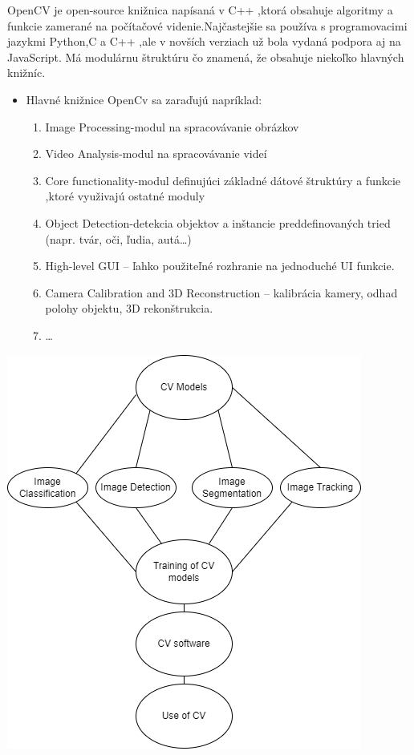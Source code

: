 \documentclass[10pt,twoside,slovak,a4paper]{article}
\begin{document}

OpenCV je  open-source knižnica napísaná v C++ ,ktorá obsahuje algoritmy a funkcie zamerané na počítačové videnie.Najčastejšie sa používa s programovacimi jazykmi Python,C a C++ ,ale v novších verziach už bola vydaná podpora aj na JavaScript. Má modulárnu štruktúru čo znamená, že obsahuje niekoľko hlavných knižníc.
\begin{itemize}
\item Hlavné knižnice OpenCv sa zaraďujú napríklad:
	\begin{enumerate}
	\item Image Processing-modul na spracovávanie obrázkov
	\item Video Analysis-modul na spracovávanie videí
	\item Core functionality-modul definujúci základné dátové štruktúry a funkcie ,ktoré využivajú ostatné moduly
	\item Object Detection-detekcia objektov a inštancie preddefinovaných tried (napr. tvár, oči, ľudia, autá…)
	\item High-level GUI – ľahko použiteľné rozhranie na jednoduché UI funkcie.
	\item Camera Calibration and 3D Reconstruction  – kalibrácia kamery, odhad polohy objektu, 3D rekonštrukcia.
	\item \ldots{}\cite{OpenCV}

	\end{enumerate}
\end{itemize}
\includegraphics[scale=0.75]{diagram.png}
\end{document}
